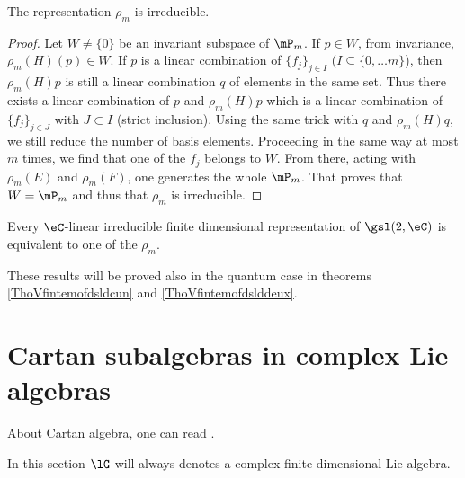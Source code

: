 \begin{proposition}		\label{ProprhomirredsldeuxC}
The representation $\rho_m$ is irreducible.
\end{proposition}

\begin{proof}
Let $W\neq\{ 0 \}$ be an invariant subspace of $\mP_m$. If $p\in W$, from invariance, $\rho_m(H)(p)\in W$. If $p$ is a linear combination of $\{ f_j \}_{j\in I}$ ($I\subseteq \{ 0,\ldots m \}$), then $\rho_m(H)p$ is still a linear combination $q$ of elements in the same set. Thus there exists a linear combination of $p$ and $\rho_m(H)p$ which is a linear combination of $\{ f_j \}_{j\in J}$ with $J\subset I$ (strict inclusion). Using the same trick with $q$ and $\rho_m(H)q$, we still reduce the number of basis elements. Proceeding in the same way at most $m$ times, we find that one of the $f_j$ belongs to $W$. From there, acting with $\rho_m(E)$ and $\rho_m(F)$, one generates the whole $\mP_m$. That proves that $W=\mP_m$ and thus that $\rho_m$ is irreducible. 
\end{proof}

\begin{theorem}[\label{GpAlgLie_Faraut}]
Every $\eC$-linear irreducible finite dimensional representation of $\gsl(2,\eC)$ is equivalent to one of the $\rho_m$.
\end{theorem}

These results will be proved also in the quantum case in theorems \ref{ThoVfintemofdsldcun} and \ref{ThoVfintemofdslddeux}.

\section{Cartan subalgebras in complex Lie algebras}
\label{SecCartaninComplex}
About Cartan algebra, one can read \cite{Dragan,Berndt,Hochschild,SamelsonNotesLieAlg}.

In this section $\lG$ will always denotes a complex finite dimensional Lie algebra. 

